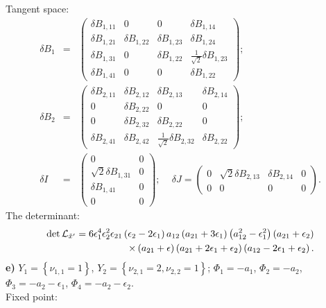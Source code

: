 \documentclass[a4paper,12pt]{article}
\begin{document}
Tangent space:
\begin{eqnarray}
\delta B_1 &=& \left(\begin{array}{cccc} \delta B_{1,11} & 0 & 0 & \delta B_{1,14} \\
\delta B_{1,21} & \delta B_{1,22} & \delta B_{1,23} & \delta B_{1,24} \\ \delta B_{1,31} & 0 & \delta B_{1,22} &
\frac{1}{\sqrt{2}} \delta B_{1,23}
\\ \delta B_{1,41} & 0 & 0 & \delta B_{1,22}
\end{array}\right); \nonumber \\
\delta B_2 &=& \left(\begin{array}{cccc} \delta B_{2,11} & \delta B_{2,12} & \delta B_{2,13} & \delta B_{2,14} \\ 0 & \delta B_{2,22} & 0 & 0 \\
0 & \delta B_{2,32} & \delta B_{2,22} & 0 \\
\delta B_{2,41} & \delta B_{2,42} & \frac{1}{\sqrt{2}} \delta B_{2,32} & \delta B_{2,22}
\end{array}\right); \nonumber \\
\delta I &=& \left(\begin{array}{cc} 0 & 0 \\ \sqrt{2}\delta B_{1,31} & 0 \\ \delta B_{1,41} & 0 \\
0 & 0
\end{array}\right); \, \, \, \, \, \, \,
\delta J=\left(\begin{array}{cccc} 0 & \sqrt{2} \delta B_{2,13} & \delta B_{2,14} & 0 \\ 0 & 0 & 0 & 0
\end{array}\right).
\end{eqnarray}
The determinant:
\begin{eqnarray}
\det {\cal L}_{{\tilde x}'}=6\epsilon_1^4 \epsilon_2^2
\epsilon_{21} \left(\epsilon_2 -2\epsilon_1 \right) a_{12}
\left(a_{21}+3\epsilon_1 \right) \left(a_{12}^2-\epsilon_1^2
\right)\left(a_{21}+\epsilon_2 \right) \nonumber \\
\times \left(a_{21}+\epsilon \right)\left(a_{21}+2\epsilon_1 +\epsilon_2 \right)\left(a_{12}-2\epsilon_1
+\epsilon_2 \right).
\end{eqnarray}
{\bf e)} $Y_1=\left\{\nu_{1,1}=1 \right\}$,
$Y_2=\left\{\nu_{2,1}=2, \nu_{2,2}=1 \right\}$; $\Phi_1=-a_1$,
$\Phi_2=-a_2$,
$\Phi_3=-a_2-\epsilon_1$, $\Phi_4=-a_2-\epsilon_2$. \\
Fixed point:
\end{document}
